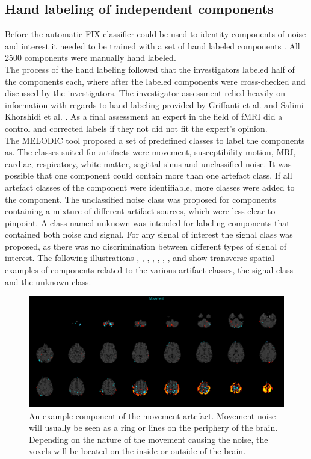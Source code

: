 \subsection{Hand labeling of independent components}
Before the automatic FIX classifier could be used to identity components of noise and interest it needed to be trained with a set of hand labeled components \cite{Salimi-Khorshidi2014}. All 2500 components were manually hand labeled. \\
The process of the hand labeling followed that the investigators labeled half of the components each, where after the labeled components were cross-checked and discussed by the investigators. The investigator assessment relied heavily on information with regards to hand labeling provided by Griffanti et al. \cite{Griffanti2017} and Salimi-Khorshidi et al. \cite{Salimi-Khorshidi2014}. As a final assessment an expert in the field of fMRI did a control and corrected labels if they not did not fit the expert's opinion. \\
The MELODIC tool proposed a set of predefined classes to label the components as. The classes suited for artifacts were movement, susceptibility-motion, MRI, cardiac, respiratory, white matter, sagittal sinus and unclassified noise. It was possible that one component could contain more than one artefact class. If all artefact classes of the component were identifiable, more classes were added to the component. The unclassified noise class was proposed for components containing a mixture of different artifact sources, which were less clear to pinpoint. A class named unknown was intended for labeling components that contained both noise and signal. For any signal of interest the signal class was proposed, as there was no discrimination between different types of signal of interest. 
The following illustrations , , , , , , ,  and  show transverse spatial examples of components related to the various artifact classes, the signal class and the unknown class.

\begin{figure}[H]                 
	\includegraphics[width=.85\textwidth]{figures/bMethods/Movement}  
	\caption{An example component of the movement artefact. Movement noise will usually be seen as a ring or lines on the periphery of the brain. Depending on the nature of the movement causing the noise, the voxels will be located on the inside or outside of the brain.}
	\label{fig:meth:Movement} 
\end{figure}


